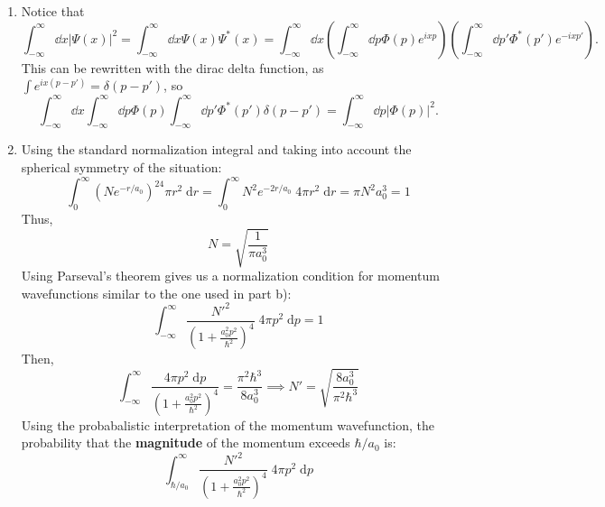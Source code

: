 \begin{sol}
\begin{enumerate}[label=\textbf{(\alph*)}]
\item Notice that 
\[\int_{-\infty}^{\infty}\dd x |\Psi (x)|^2 = \int_{-\infty}^{\infty}\dd x \Psi (x) \Psi^{*}(x) = \int_{-\infty}^{\infty} \dd x \left( \int_{-\infty}^{\infty} \dd p \Phi (p) e^{ixp}\right)\left(\int_{-\infty}^{\infty} \dd p' \Phi^{*} (p') e^{-ixp'}\right).  \]
This can be rewritten with the dirac delta function, as $\int e^{ix (p - p')} = \delta (p - p')$, so 
\[\int_{-\infty}^{\infty}\dd x\int_{-\infty}^{\infty}\dd p \Phi (p) \int_{-\infty}^{\infty}\dd p' \Phi^{*} (p') \delta (p - p') = \int_{-\infty}^{\infty} \dd p |\Phi (p)|^2.\]
\item Using the standard normalization integral and taking into account the spherical symmetry of the situation: $$\int_{0}^{\infty}\left(Ne^{-r/a_0}\right)^24\pi r^2\;\mathrm{d}r = \int_{0}^{\infty}N^2e^{-2r/a_0}\;4\pi r^2\;\mathrm{d}r = \pi N^2a_0^3 = 1$$ Thus, $$N = \sqrt{\frac{1}{\pi a_0^3}}$$
Using Parseval's theorem gives us a normalization condition for momentum wavefunctions similar to the one used in part b): $$\int_{-\infty}^{\infty}\frac{N'^2}{\left(1 + \frac{a_0^2p^2}{\hbar^2}\right)^4}\;4\pi p^2\;\mathrm{d}p = 1$$ Then, $$\int_{-\infty}^{\infty}\frac{4\pi p^2\;\mathrm{d}p}{\left(1 + \frac{a_0^2p^2}{\hbar^2}\right)^4} = \frac{\pi^2\hbar^3}{8a_0^3} \implies N' = \sqrt{\frac{8a_0^3}{\pi^2\hbar^3}}$$
Using the probabalistic interpretation of the momentum wavefunction, the probability that the \textbf{magnitude} of the momentum exceeds $\hbar/a_0$ is: $$\int_{\hbar/a_0}^{\infty}\frac{N'^2}{\left(1 + \frac{a_0^2p^2}{\hbar^2}\right)^4}\;4\pi p^2\;\mathrm{d}p$$
\end{enumerate}
\end{sol}